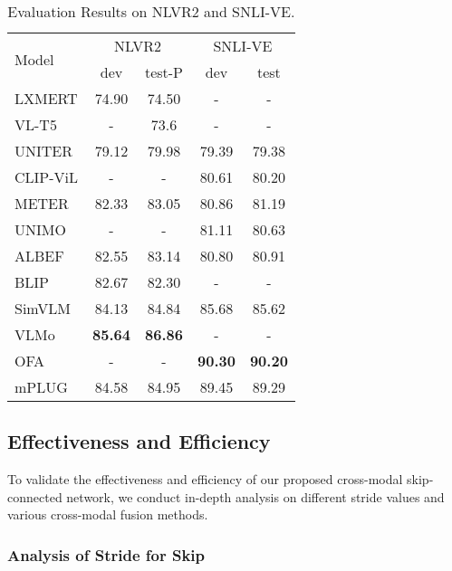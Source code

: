 \documentclass[11pt]{article}
\begin{document}
\begin{table}[t]
\setlength\tabcolsep{5pt}
\centering
\begin{tabular}{lcccc}
\toprule
\multicolumn{1}{l}{\multirow{2}{*}{Model}}      &
\multicolumn{2}{c}{NLVR2} & \multicolumn{2}{c}{SNLI-VE} \\
       & dev & test-P &  dev & test   \\
\midrule
LXMERT\cite{tan2019lxmert} & 74.90 & 74.50 & - & - \\
VL-T5\cite{vlt5}  & - & 73.6 & - & - \\
UNITER\cite{chen2020uniter} & 79.12 & 79.98 & 79.39 & 79.38  \\
CLIP-ViL\cite{shen2021much} & - & - & 80.61 & 80.20 \\
METER\cite{dou2021empirical} & 82.33 & 83.05 & 80.86 & 81.19 \\
UNIMO\cite{li2020unimo} & - & - & 81.11 & 80.63  \\ 
ALBEF\cite{li2021align} & 82.55 & 83.14 & 80.80 & 80.91 \\
BLIP\cite{li2022blip}  & 82.67 & 82.30 & - & - \\
SimVLM\cite{wang2021simvlm} & 84.13 & 84.84 & 85.68 & 85.62 \\
VLMo\cite{wang2021vlmo} & \textbf{85.64} & \textbf{86.86} & - & - \\
OFA\cite{wang2022OFA}  & - & - & \textbf{90.30} & \textbf{90.20} \\
\midrule
mPLUG  & 84.58  & 84.95 & 89.45 & 89.29 \\
\bottomrule
\end{tabular}
\caption{Evaluation Results on NLVR2 and SNLI-VE.}
\label{table:reasoning}
\end{table}


















\subsection{Effectiveness and Efficiency}
To validate the effectiveness and efficiency of our proposed cross-modal skip-connected network, we conduct in-depth analysis on different stride values and various cross-modal fusion methods.

\subsubsection{Analysis of Stride for Skip}
\end{document}
